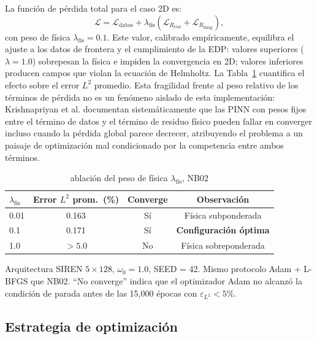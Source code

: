 La función de pérdida total para el caso 2D es:
%
\begin{equation}
  \mathcal{L} = \mathcal{L}_{\mathrm{datos}}
              + \lambda_{\mathrm{fís}}\!\left(
                  \mathcal{L}_{R_{\mathrm{real}}} + \mathcal{L}_{R_{\mathrm{imag}}}
                \right),
  \label{eq:loss_2d}
\end{equation}
%
con peso de física $\lambda_{\mathrm{fís}} = 0.1$.
Este valor, calibrado empíricamente, equilibra el ajuste a los datos de frontera y
el cumplimiento de la EDP: valores superiores ($\lambda = 1.0$) sobrepesan la física
e impiden la convergencia en 2D; valores inferiores producen campos que violan la
ecuación de Helmholtz.
La Tabla~\ref{tab:ablacion_lambda} cuantifica el efecto sobre el error $L^2$ promedio.
Esta fragilidad frente al peso relativo de los términos de pérdida no es un fenómeno
aislado de esta implementación: Krishnapriyan et al. \cite{Krishnapriyan2021_failureModes}
documentan sistemáticamente que las PINN con pesos fijos entre el término de datos y el
término de residuo físico pueden fallar en converger incluso cuando la pérdida global
parece decrecer, atribuyendo el problema a un paisaje de optimización mal condicionado
por la competencia entre ambos términos.

\begin{table}[t]
\centering
\renewcommand{\arraystretch}{1.2}
\caption{ablación del peso de física $\lambda_{\mathrm{fís}}$, NB02}
\label{tab:ablacion_lambda}
\begin{tabular}{lccc}
\hline
$\lambda_{\mathrm{fís}}$ & Error $L^2$ prom.\ (\%) & Converge & Observación \\
\hline
0.01  & 0.163 & Sí & Física subponderada \\
0.1   & 0.171 & Sí & \textbf{Configuración óptima} \\
1.0   & $>5.0$ & No & Física sobreponderada \\
\hline
\end{tabular}
\end{table}
\noindent\footnotesize Arquitectura SIREN $5\times128$, $\omega_0 = 1.0$, SEED = 42.
Mismo protocolo Adam + L-BFGS que NB02.
``No converge'' indica que el optimizador Adam no alcanzó la condición
de parada antes de las 15{,}000 épocas con $\varepsilon_{L^2} < 5\%$.
\normalsize

\subsection{Estrategia de optimización}
\label{subsec:optimizacion}

